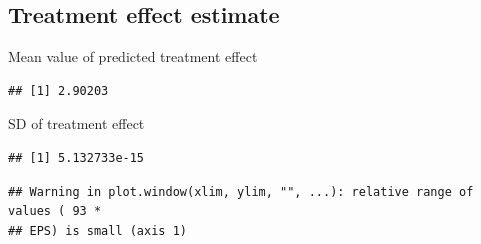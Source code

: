 \documentclass[
]{book}
\newenvironment{Shaded}{\begin{snugshade}}{\end{snugshade}}
\newcommand{\AttributeTok}[1]{\textcolor[rgb]{0.77,0.63,0.00}{#1}}
\newcommand{\FunctionTok}[1]{\textcolor[rgb]{0.00,0.00,0.00}{#1}}
\newcommand{\NormalTok}[1]{#1}
\newcommand{\OtherTok}[1]{\textcolor[rgb]{0.56,0.35,0.01}{#1}}
\newcommand{\SpecialCharTok}[1]{\textcolor[rgb]{0.00,0.00,0.00}{#1}}
\newcommand{\StringTok}[1]{\textcolor[rgb]{0.31,0.60,0.02}{#1}}
\begin{document}
\begin{Shaded}
\end{Shaded}

\hypertarget{treatment-effect-estimate}{%
\subsection{Treatment effect estimate}\label{treatment-effect-estimate}}

Mean value of predicted treatment effect

\begin{Shaded}
\end{Shaded}

\begin{verbatim}
## [1] 2.90203
\end{verbatim}

SD of treatment effect

\begin{Shaded}
\end{Shaded}

\begin{verbatim}
## [1] 5.132733e-15
\end{verbatim}

\begin{Shaded}
\end{Shaded}

\begin{verbatim}
## Warning in plot.window(xlim, ylim, "", ...): relative range of values ( 93 *
## EPS) is small (axis 1)
\end{verbatim}
\end{document}
